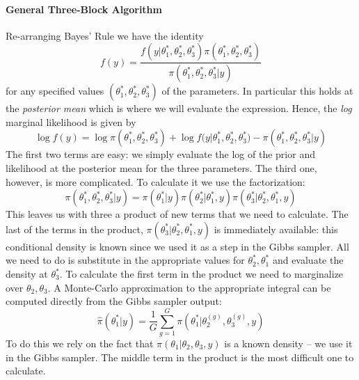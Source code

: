 \documentclass[12pt]{article}
\begin{document}
\paragraph{General Three-Block Algorithm} 
Re-arranging Bayes' Rule we have the identity
\begin{equation*}
  f(y) = \frac{f(y|\theta_1^*, \theta^*_2, \theta_3^*)\pi\left( \theta^*_1, \theta^*_2, \theta^*_3 \right)}{\pi\left( \theta_1^*, \theta_2^*, \theta_3^*|y \right)}
\end{equation*}
for any specified values $(\theta_1^*, \theta_2^*, \theta_3^*)$ of the parameters.
In particular this holds at the \emph{posterior mean} which is where we will evaluate the expression.
Hence, the \emph{log} marginal likelihood is given by
\begin{equation*}
  \log{f(y)} =  \log \pi\left( \theta^*_1, \theta^*_2, \theta^*_3 \right) + \log{f(y|\theta^*_1, \theta^*_2, \theta^*_3}) - \pi\left( \theta^*_1, \theta^*_2, \theta^*_3|y \right)
\end{equation*}
The first two terms are easy: we simply evaluate the log of the prior and likelihood at the posterior mean for the three parameters.
The third one, however, is more complicated.
To calculate it we use the factorization:
\begin{equation*}
\pi\left( \theta^*_1, \theta^*_2, \theta^*_3|y \right) = \pi(\theta^*_1|y) \pi\left( \theta^*_2|\theta^*_1,y \right)\pi\left( \theta^*_3|\theta^*_2, \theta^*_1,y \right)
\end{equation*}
This leaves us with three a product of new terms that we need to calculate.
The last of the terms in the product, $\pi(\theta^*_3|\theta^*_2, \theta^*_1, y)$ is immediately available: this conditional density is known since we used it as a step in the Gibbs sampler.
All we need to do is substitute in the appropriate values for $\theta^*_2,\theta^*_1$ and evaluate the density at $\theta^*_3$.
To calculate the first term in the product we need to marginalize over $\theta_2, \theta_3$.
A Monte-Carlo approximation to the appropriate integral can be computed directly from the Gibbs sampler output:
\begin{equation*}
  \widehat{\pi}\left( \theta^*_1|y \right) = \frac{1}{G}\sum_{g=1}^{G} \pi\left( \theta^*_1|\theta_2^{(g)}, \theta_3^{(g)}, y \right)
\end{equation*}
To do this we rely on the fact that $\pi(\theta_1|\theta_2, \theta_3, y)$ is a known density -- we use it in the Gibbs sampler.
The middle term in the product is the most difficult one to calculate.
\end{document}
